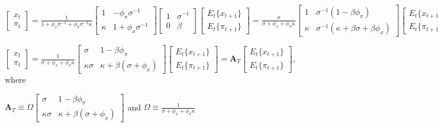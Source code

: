 \documentclass[
]{article}
\begin{document}
\(\displaystyle \left[ \begin{matrix} x_t\\ \pi_t \end{matrix} \right] = \frac{1}{1+\phi_x \sigma^{-1}+ \phi_\pi \sigma^{-1} \kappa} \left[ \begin{matrix} 1 & -\phi_\pi \sigma^{-1}\\ \kappa & 1+\phi_x \sigma^{-1} \end{matrix} \right] \left[ \begin{matrix} 1 & \sigma^{-1} \\ 0 & \beta \end{matrix} \right] \left[ \begin{matrix} E_t\{x_{t+1} \}\\ E_t \{\pi_{t+1} \} \end{matrix} \right]=\frac{\sigma}{\sigma+\phi_x + \phi_\pi \kappa}\left[ \begin{matrix} 1& \sigma^{-1}(1-\beta \phi_\pi)\\ \kappa & \sigma^{-1}(\kappa+\beta \sigma+\beta\phi_x) \end{matrix} \right] \left[ \begin{matrix} E_t\{x_{t+1} \}\\ E_t \{\pi_{t+1} \} \end{matrix} \right]\)

\(\displaystyle \left[ \begin{matrix} x_t\\ \pi_t \end{matrix} \right] =\frac{1}{\sigma+\phi_x + \phi_\pi \kappa}\left[ \begin{matrix} \sigma& 1-\beta \phi_\pi\\ \kappa \sigma & \kappa+\beta (\sigma+\phi_x) \end{matrix} \right] \left[ \begin{matrix} E_t\{x_{t+1} \}\\ E_t \{\pi_{t+1} \} \end{matrix} \right]=\mathbf{A}_T\left[ \begin{matrix} E_t\{x_{t+1} \}\\ E_t \{\pi_{t+1} \} \end{matrix} \right]\),
where

\(\displaystyle \mathbf{A}_T \equiv\Omega\left[ \begin{matrix} \sigma& 1-\beta \phi_\pi\\ \kappa \sigma & \kappa+\beta (\sigma+\phi_x) \end{matrix} \right]\)
and
\(\displaystyle \Omega \equiv\frac{1}{\sigma+\phi_x + \phi_\pi\kappa}\)
\end{document}
